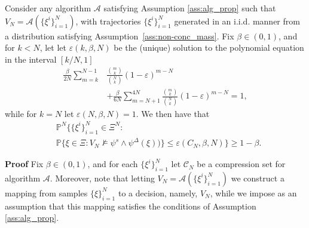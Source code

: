 \begin{thm}
\label{thm:Guarantees}
Consider any algorithm $\mathcal{A}$ satisfying Assumption \ref{ass:alg_prop} such that $V_N = \mathcal{A}(\{\xi^i\}_{i=1}^{N})$, with trajectories $\{\xi^i\}_{i=1}^{N}$ generated in an i.i.d. manner from a distribution satisfying Assumption~\ref{ass:non-conc_mass}. 
Fix $\beta \in (0,1)$, and for $k<N$, let
let $\varepsilon(k,\beta,N)$ be the (unique) solution to the polynomial equation in the interval $[k/N,1]$
    \begin{align}
               \frac{\beta}{2N} \sum_{m=k}^{N-1}&\frac{\binom{m}{k}}{\binom{N}{k}}(1-\varepsilon)^{m-N} \nonumber \\
               &+\frac{\beta}{6N}\sum_{m=N+1}^{4N}\frac{\binom{m}{k}}{\binom{N}{k}}(1-\varepsilon)^{m-N} = 1,
     \end{align}
    while for $k=N$ let $\varepsilon(N,\beta,N) =1$. We then have that
    \begin{align}
	    \label{eq:cert_bound}
        &\mathbb{P}^N\big\{ \{\xi^i\}_{i=1}^N \in \Xi^N:~  \\
        &\mathbb{P}\{\xi \in \Xi\colon V_N \not\models \psi^s \wedge \psi^\Delta(\xi)) \} \leq \varepsilon(C_N,\beta,N)\big\} \nonumber \geq 1-\beta.
    \end{align}
\end{thm}
\textbf{Proof}
Fix $\beta \in (0,1)$, and for each $\{\xi^i\}_{i=1}^N$ let $\mathcal{C}_N$ be a compression set for algorithm $\mathcal{A}$. Moreover, note
that letting $V_N = \mathcal{A}(\{\xi^i\}_{i=1}^{N})$ we construct a mapping from samples $\{\xi\}_{i=1}^N$ to a decision, namely, $V_N$, while we impose as an assumption that this mapping satisfies the conditions of Assumption \ref{ass:alg_prop}. 

